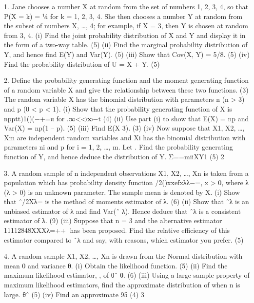 
1. Jane chooses a number X at random from the set of numbers {1, 2, 3, 4}, so that
P(X = k) = ¼ for k = 1, 2, 3, 4.
She then chooses a number Y at random from the subset of numbers {X, …, 4}; for example, if X = 3, then Y is chosen at random from {3, 4}.
(i) Find the joint probability distribution of X and Y and display it in the form of a two-way table.
(5)
(ii) Find the marginal probability distribution of Y, and hence find E(Y) and Var(Y).
(5)
(iii) Show that Cov(X, Y) = 5/8.
(5)
(iv) Find the probability distribution of U = X + Y.
(5)


2. Define the probability generating function and the moment generating function of a random variable X and give the relationship between these two functions.
(3)
The random variable X has the binomial distribution with parameters n (n > 3) and p (0 < p < 1).
(i) Show that the probability generating function of X is
npptt)1()(−+=π
for .∞<<∞−t
(4)
(ii) Use part (i) to show that E(X) = np and Var(X) = np(1 – p).
(5)
(iii) Find E(X 3).
(3)
(iv) Now suppose that X1, X2, …, Xm are independent random variables and Xi has the binomial distribution with parameters ni and p for i = 1, 2, …, m. Let . Find the probability generating function of Y, and hence deduce the distribution of Y. Σ==miiXY1
(5)
2



3. A random sample of n independent observations X1, X2, …, Xn is taken from a population which has probability density function /2()xxefxλλ−=, x > 0,
where λ (λ > 0) is an unknown parameter. The sample mean is denoted by X.
(i) Show that ˆ/2Xλ= is the method of moments estimator of λ.
(6)
(ii) Show that ˆλ is an unbiased estimator of λ and find Var(ˆ
λ). Hence deduce that ˆλ is a consistent estimator of λ.
(9)
(iii) Suppose that n = 3 and the alternative estimator 11112848XXXλ=++􀀄
has been proposed. Find the relative efficiency of this estimator compared to ˆλ
and say, with reasons, which estimator you prefer.
(5)

4. A random sample X1, X2, …, Xn is drawn from the Normal distribution with mean 0 and variance θ.
(i) Obtain the likelihood function.
(5)
(ii) Find the maximum likelihood estimator, , of θˆ θ.
(6)
(iii) Using a large sample property of maximum likelihood estimators, find the approximate distribution of when n is large. θˆ
(5)
(iv) Find an approximate 95%
(4)
3
